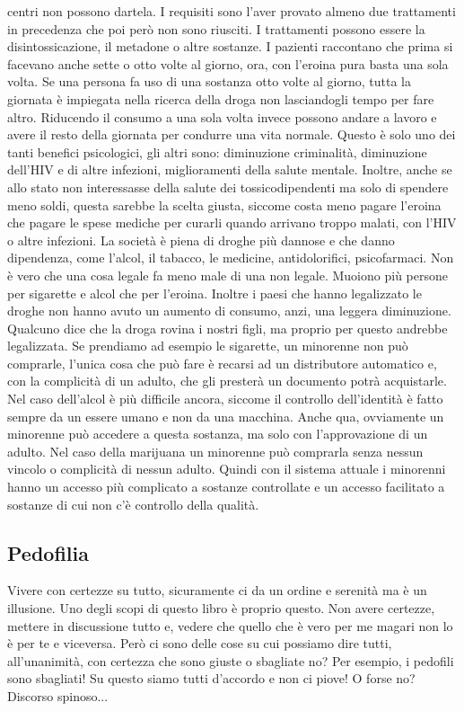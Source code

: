 \documentclass[12pt]{book} %
\begin{document}
centri non possono dartela. I requisiti sono l'aver provato almeno due trattamenti in precedenza
che poi però non sono riusciti. I trattamenti possono essere la disintossicazione, il metadone o altre sostanze. I
pazienti raccontano che prima si facevano anche sette o otto volte al giorno, ora, con l'eroina
pura basta una sola volta. Se una persona fa uso di una sostanza otto volte al giorno, tutta la giornata è impiegata
nella ricerca della droga non lasciandogli tempo per fare altro. Riducendo il consumo a una sola volta invece possono
andare a lavoro e avere il resto della giornata per condurre una vita normale. Questo è solo uno dei tanti benefici
psicologici, gli altri sono: diminuzione criminalità, diminuzione dell'HIV e di altre infezioni,
miglioramenti della salute mentale. Inoltre, anche se allo stato non interessasse della salute dei tossicodipendenti ma
solo di spendere meno soldi, questa sarebbe la scelta giusta, siccome costa meno pagare l'eroina
che pagare le spese mediche per curarli quando arrivano troppo malati, con l'HIV o altre
infezioni. La società è piena di droghe più dannose e che danno dipendenza, come l'alcol, il
tabacco, le medicine, antidolorifici, psicofarmaci. Non è vero che una cosa legale fa meno male di una non legale.
Muoiono più persone per sigarette e alcol che per l'eroina. Inoltre i paesi che hanno legalizzato
le droghe non hanno avuto un aumento di consumo, anzi, una leggera
diminuzione. Qualcuno dice che
la droga rovina i nostri figli, ma proprio per questo andrebbe legalizzata. Se prendiamo ad esempio le sigarette, un
minorenne non può comprarle, l'unica cosa che può fare è recarsi ad un distributore automatico e,
con la complicità di un adulto, che gli presterà un documento potrà acquistarle. Nel caso
dell'alcol è più difficile ancora, siccome il controllo dell'identità è fatto
sempre da un essere umano e non da una macchina. Anche qua, ovviamente un minorenne può accedere a questa sostanza, ma
solo con l'approvazione di un adulto. Nel caso della marijuana un minorenne può comprarla senza
nessun vincolo o complicità di nessun adulto. Quindi con il sistema attuale i minorenni hanno un accesso più complicato
a sostanze controllate e un accesso facilitato a sostanze di cui non c'è controllo della qualità.

\subsection{Pedofilia}
Vivere con certezze su tutto, sicuramente ci da un ordine e serenità ma è un illusione. Uno degli scopi di questo libro
è proprio questo. Non avere certezze, mettere in discussione tutto e, vedere che quello che è vero per me magari non lo
è per te e viceversa. Però ci sono delle cose su cui possiamo dire tutti, all'unanimità, con certezza che sono giuste o
sbagliate no? Per esempio, i pedofili sono sbagliati! Su questo siamo tutti d'accordo e non ci piove! O forse no?
Discorso spinoso...
\end{document}
